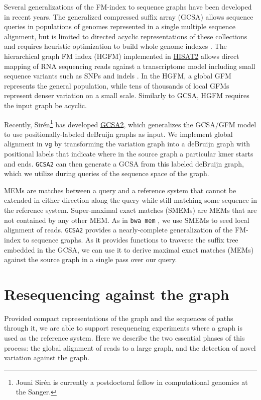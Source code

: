 \documentclass[12pt]{article}
\begin{document}
Several generalizations of the FM-index to sequence graphs have been developed in recent years.
The generalized compressed suffix array (GCSA) allows sequence queries in populations of genomes represented in a single multiple sequence alignment, but is limited to directed acyclic representations of these collections and requires heuristic optimization to build whole genome indexes \cite{siren2011indexing, siren2014indexing}.
The hierarchical graph FM index (HGFM) implemented in \href{https://github.com/infphilo/hisat2}{HISAT2} allows direct mapping of RNA sequencing reads against a transcriptome model including small sequence variants such as SNPs and indels \cite{kim2015hisat}.
In the HGFM, a global GFM represents the general population, while tens of thousands of local GFMs represent denser variation on a small scale.
Similarly to GCSA, HGFM requires the input graph be acyclic.

Recently, Sirén\footnote{Jouni Sirén is currently a postdoctoral fellow in computational genomics at the Sanger.} has developed \href{https://github.com/jltsiren/gcsa2}{GCSA2}, which generalizes the GCSA/GFM model to use positionally-labeled deBruijn graphs as input.
We implement global alignment in {\tt vg} by transforming the variation graph into a deBruijn graph with positional labels that indicate where in the source graph a particular kmer starts and ends.
{\tt GCSA2} can then generate a GCSA from this labeled deBruijn graph, which we utilize during queries of the sequence space of the graph.

MEMs are matches between a query and a reference system that cannot be extended in either direction along the query while still matching some sequence in the reference system.
Super-maximal exact matches (SMEMs) are MEMs that are not contained by any other MEM.
As in {\tt bwa mem} \cite{li2013bwamem}, we use SMEMs to seed local alignment of reads.
{\tt GCSA2} provides a nearly-complete generalization of the FM-index to sequence graphs.
As it provides functions to traverse the suffix tree embedded in the GCSA, we can use it to derive maximal exact matches (MEMs) against the source graph in a single pass over our query.

\section{Resequencing against the graph}

Provided compact representations of the graph and the sequences of paths through it, we are able to support resequencing experiments where a graph is used as the reference system.
Here we describe the two essential phases of this process: the global alignment of reads to a large graph, and the detection of novel variation against the graph.
\end{document}
